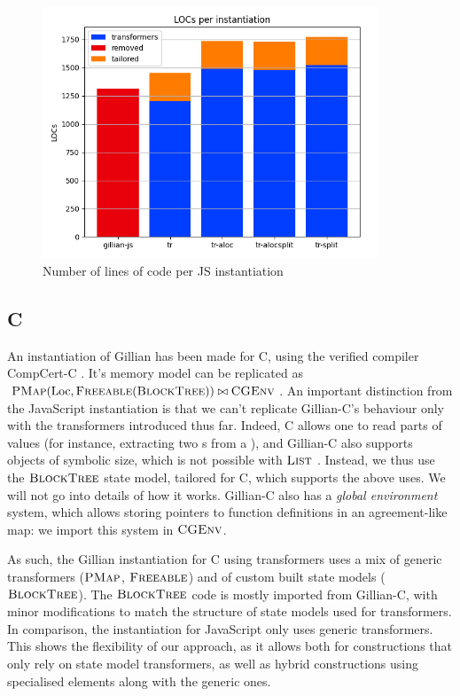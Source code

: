 \begin{figure}
	\centering
	\includegraphics[width=10cm]{figures/js-loc-count.png}
	\caption{Number of lines of code per JS instantiation}
	\label{fig:js-loc-count}
\end{figure}

\subsection{C}

An instantiation of Gillian has been made for C, using the verified compiler CompCert-C \cite{gillian2}. It's memory model can be replicated as $\textsc{PMap}(\text{Loc},\textsc{Freeable}(\textsc{BlockTree})) \bowtie \textsc{CGEnv}$. An important distinction from the JavaScript instantiation is that we can't replicate Gillian-C's behaviour only with the transformers introduced thus far. Indeed, C allows one to read parts of values (for instance, extracting two s from a ), and Gillian-C also supports objects of symbolic size, which is not possible with $\textsc{List}$ . Instead, we thus use the $\textsc{BlockTree}$ state model, tailored for C, which supports the above uses. We will not go into details of how it works. Gillian-C also has a \emph{global environment} system, which allows storing pointers to function definitions in an agreement-like map: we import this system in $\textsc{CGEnv}$.

As such, the Gillian instantiation for C using transformers uses a mix of generic transformers ($\textsc{PMap}$, $\textsc{Freeable}$) and of custom built state models ($\textsc{BlockTree}$). The $\textsc{BlockTree}$ code is mostly imported from Gillian-C, with minor modifications to match the structure of state models used for transformers. In comparison, the instantiation for JavaScript only uses generic transformers. This shows the flexibility of our approach, as it allows both for constructions that only rely on state model transformers, as well as hybrid constructions using specialised elements along with the generic ones.

